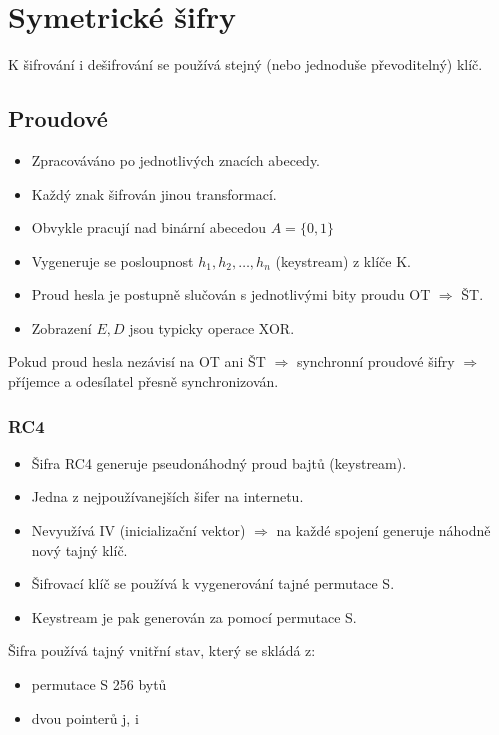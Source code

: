 \documentclass{szzclass}
\begin{document}
\section{Symetrické šifry}
K šifrování i dešifrování se používá stejný (nebo jednoduše převoditelný) klíč.

\subsection{Proudové}
\begin{itemize}
\item Zpracováváno po jednotlivých znacích abecedy.
\item Každý znak šifrován jinou transformací.
\item Obvykle pracují nad binární abecedou $A=\{0,1\}$
\item Vygeneruje se posloupnost $h_1,h_2,\dots,h_n$ (keystream) z klíče K.
\item Proud hesla je postupně slučován s jednotlivými bity proudu OT $\Rightarrow$ ŠT.
\item Zobrazení $E, D$ jsou typicky operace XOR.
\end{itemize}

Pokud proud hesla nezávisí na OT ani ŠT $\Rightarrow$ synchronní proudové šifry $\Rightarrow$ příjemce a odesílatel přesně synchronizován.

\subsubsection{RC4}
\begin{itemize}
\item Šifra RC4 generuje pseudonáhodný proud bajtů (keystream).
\item Jedna z nejpoužívanejších šifer na internetu.
\item Nevyužívá IV (inicializační vektor) $\Rightarrow$ na každé spojení generuje náhodně nový tajný klíč.
\item Šifrovací klíč se používá k vygenerování tajné permutace S.
\item Keystream je pak generován za pomocí permutace S.
\end{itemize}

Šifra používá tajný vnitřní stav, který se skládá z:
\begin{itemize}
\item permutace S 256 bytů
\item dvou pointerů j, i
\end{itemize}
\end{document}
